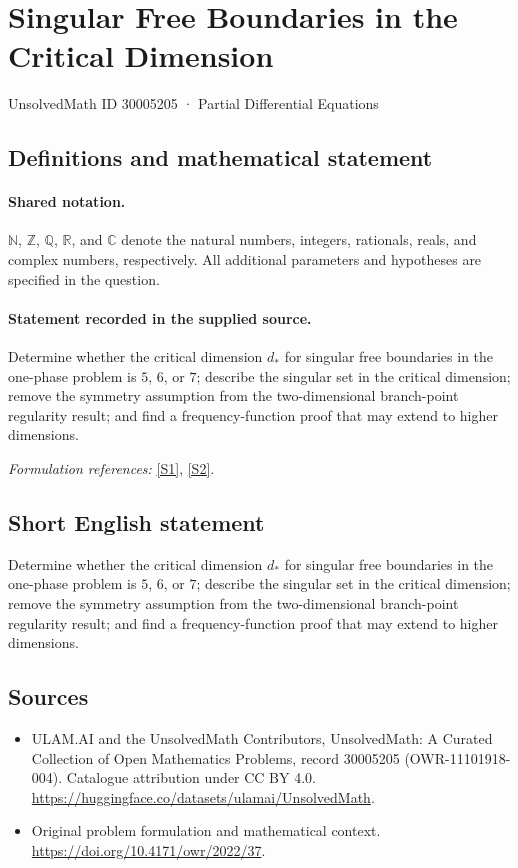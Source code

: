 \documentclass[11pt]{article}
\newcommand{\sref}[2]{\hyperlink{source:#1:#2}{[S#2]}}
\begin{document}
\setcounter{section}{30005204}
\section{Singular Free Boundaries in the Critical Dimension}\label{30005205}
{\small UnsolvedMath ID 30005205 · Partial Differential Equations}
\subsection{Definitions and mathematical statement}

\paragraph{Shared notation.}$\mathbb N$, $\mathbb Z$, $\mathbb Q$, $\mathbb R$, and $\mathbb C$ denote the natural numbers, integers, rationals, reals, and complex numbers, respectively. All additional parameters and hypotheses are specified in the question.


\paragraph{Statement recorded in the supplied source.}
Determine whether the critical dimension $d_*$ for singular free boundaries in the one-phase problem is $5$, $6$, or $7$; describe the singular set in the critical dimension; remove the symmetry assumption from the two-dimensional branch-point regularity result; and find a frequency-function proof that may extend to higher dimensions.
\par\smallskip\textit{Formulation references:} \sref{30005205}{1}, \sref{30005205}{2}.
\subsection{Short English statement}
Determine whether the critical dimension $d_*$ for singular free boundaries in the one-phase problem is $5$, $6$, or $7$; describe the singular set in the critical dimension; remove the symmetry assumption from the two-dimensional branch-point regularity result; and find a frequency-function proof that may extend to higher dimensions.
\subsection{Sources}
\begin{itemize}
\item[\hypertarget{source:30005205:1}{S1}] ULAM.AI and the UnsolvedMath Contributors, UnsolvedMath: A Curated Collection of Open Mathematics Problems, record 30005205 (OWR-11101918-004). Catalogue attribution under CC BY 4.0.
\url{https://huggingface.co/datasets/ulamai/UnsolvedMath}.
\item[\hypertarget{source:30005205:2}{S2}] Original problem formulation and mathematical context.
\url{https://doi.org/10.4171/owr/2022/37}.
\end{itemize}
\label{end:30005205}
\end{document}
